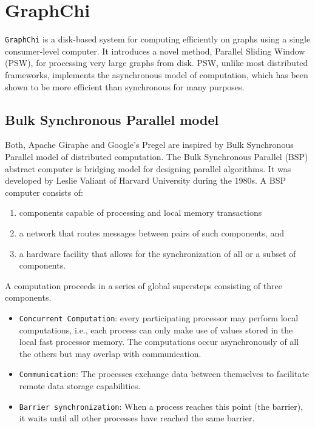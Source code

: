 \documentclass[letterpaper,twocolumn,10pt]{article}
\begin{document}
\section{GraphChi}
{\tt GraphChi} is a disk-based system for computing efficiently on graphs using a single consumer-level computer. It introduces a novel method, Parallel Sliding Window (PSW), for processing very large graphs from disk. PSW, unlike most distributed frameworks, implements the asynchronous model of computation, which has been shown to be more efficient than synchronous for many purposes.	


\subsection{Bulk Synchronous Parallel model}
Both, Apache Giraphe and Google's Pregel are inspired by Bulk Synchronous Parallel model of distributed computation.
The Bulk Synchronous Parallel (BSP) abstract computer is bridging model for designing parallel algorithms. It was developed by Leslie Valiant of Harvard University during the 1980s. A BSP computer consists of:
\begin{enumerate}
\item components capable of processing and local memory transactions
\item a network that routes messages between pairs of such components, and
\item a hardware facility that allows for the synchronization of all or a subset of components.
\end{enumerate}
A computation proceeds in a series of global supersteps consisting of three components.
\begin{itemize}
\item {\tt Concurrent Computation}: every participating processor may perform local computations, i.e., each process can only make use of values stored in the local fast processor memory. The computations occur asynchronously of all the others but may overlap with communication.
\item {\tt Communication}: The processes exchange data between themselves to facilitate remote data storage capabilities.
\item {\tt Barrier synchronization}: When a process reaches this point (the barrier), it waits until all other processes have reached the same barrier.
\end{itemize}
{\footnotesize 
}


\theendnotes
\end{document}
